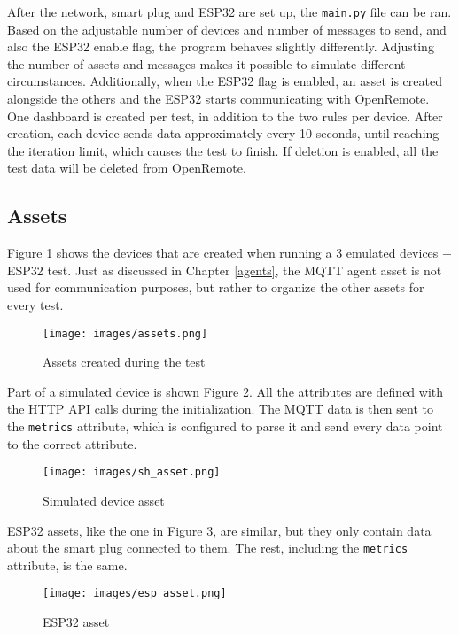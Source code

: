 After the network, smart plug and ESP32 are set up, the \lstinline|main.py| file can be ran. Based on the adjustable number of devices and number of messages to send, and also the ESP32 enable flag, the program behaves slightly differently. Adjusting the number of assets and messages makes it possible to simulate different circumstances. Additionally, when the ESP32 flag is enabled, an asset is created alongside the others and the ESP32 starts communicating with OpenRemote. One dashboard is created per test, in addition to the two rules per device. After creation, each device sends data approximately every 10 seconds, until reaching the iteration limit, which causes the test to finish. If deletion is enabled, all the test data will be deleted from OpenRemote. 

\subsection{Assets}
Figure \ref{fig:assets} shows the devices that are created when running a 3 emulated devices + ESP32 test. Just as discussed in Chapter \ref{agents}, the MQTT agent asset is not used for communication purposes, but rather to organize the other assets for every test.

\begin{figure}[ht]
	\centering
	\texttt{[image: images/assets.png]}
	\caption{Assets created during the test}
	\label{fig:assets}
\end{figure}

Part of a simulated device is shown Figure \ref{fig:sh_asset}. All the attributes are defined with the HTTP API calls during the initialization. The MQTT data is then sent to the \lstinline|metrics| attribute, which is configured to parse it and send every data point to the correct attribute.

\begin{figure}[ht]
	\centering
	\texttt{[image: images/sh\_asset.png]}
	\caption{Simulated device asset}
	\label{fig:sh_asset}
\end{figure}

ESP32 assets, like the one in Figure \ref{fig:esp_asset}, are similar, but they only contain data about the smart plug connected to them. The rest, including the \lstinline|metrics| attribute, is the same.

\begin{figure}[ht]
	\centering
	\texttt{[image: images/esp\_asset.png]}
	\caption{ESP32 asset}
	\label{fig:esp_asset}
\end{figure}

